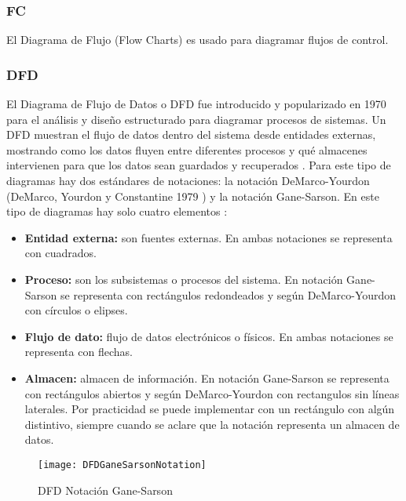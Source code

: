 \subsubsection{FC}
El Diagrama de Flujo (Flow Charts) es usado para diagramar flujos de control.

\subsubsection{DFD}

El Diagrama de Flujo de Datos o DFD fue introducido y popularizado en 1970 para el análisis y diseño estructurado \cite{Gane-Sarson-1979} para diagramar procesos de sistemas. Un DFD muestran el flujo de datos dentro del sistema desde entidades externas, mostrando como los datos fluyen entre diferentes procesos y qué almacenes intervienen para que los datos sean guardados y recuperados \cite{Scott-Ambler-2004}. 
Para este tipo de diagramas hay dos estándares de notaciones: la notación DeMarco-Yourdon (DeMarco, Yourdon y Constantine 1979 \cite{Dixit-2007}) y la notación Gane-Sarson.\newline
\newline
En este tipo de diagramas hay solo cuatro elementos \cite{Dixit-2007}:
\begin{itemize}
\item \textbf{Entidad externa:} son fuentes externas. En ambas notaciones se representa con cuadrados.
\item \textbf{Proceso:} son los subsistemas o procesos del sistema. En notación Gane-Sarson se representa con rectángulos redondeados y según DeMarco-Yourdon con círculos o elipses.  
\item \textbf{Flujo de dato:} flujo de datos electrónicos o físicos. En ambas notaciones se representa con flechas.
\item \textbf{Almacen:} almacen de información. En notación Gane-Sarson se representa con rectángulos abiertos y según DeMarco-Yourdon con rectangulos sin líneas laterales. Por practicidad se puede implementar con un rectángulo con algún distintivo, siempre cuando se aclare que la notación representa un almacen de datos.
\end{itemize}

\begin{figure}[h]
  \centering
  \texttt{[image: DFDGaneSarsonNotation]}
  \caption{DFD Notación Gane-Sarson \cite{Gane-Sarson-1979}}
  \centering
  \label{fig:DFDGaneSarsonNotation} %
\end{figure}

